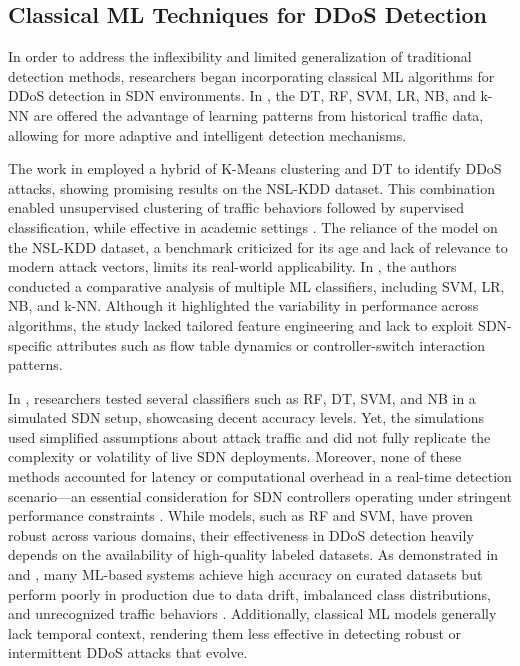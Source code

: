\documentclass[ASNA,twocolumn]{USG} %
\begin{document}
 \subsection{Classical ML Techniques for DDoS Detection}

In order to address the inflexibility and limited generalization of traditional detection methods, researchers began incorporating classical ML algorithms for DDoS detection in SDN environments. In \cite{bansal2022comparative}, the DT, RF, SVM, LR, NB, and k-NN are offered the advantage of learning patterns from historical traffic data, allowing for more adaptive and intelligent detection mechanisms.

The work in \cite{tan2020new} employed a hybrid of K-Means clustering and DT to identify DDoS attacks, showing promising results on the NSL-KDD dataset. This combination enabled unsupervised clustering of traffic behaviors followed by supervised classification, while effective in academic settings \cite{lv2024hybrid}. The reliance of the model on the NSL-KDD dataset, a benchmark criticized for its age and lack of relevance to modern attack vectors, limits its real-world applicability. In \cite{khashab2021ddos}, the authors conducted a comparative analysis of multiple ML classifiers, including SVM, LR, NB, and k-NN. Although it highlighted the variability in performance across algorithms, the study lacked tailored feature engineering and lack to exploit SDN-specific attributes such as flow table dynamics or controller-switch interaction patterns.

In \cite{nadeem2022ddos}, researchers tested several classifiers such as RF, DT, SVM, and NB in a simulated SDN setup, showcasing decent accuracy levels. Yet, the simulations used simplified assumptions about attack traffic and did not fully replicate the complexity or volatility of live SDN deployments. Moreover, none of these methods accounted for latency or computational overhead in a real-time detection scenario—an essential consideration for SDN controllers operating under stringent performance constraints \cite{khashab2021ddos}. While models, such as RF and SVM, have proven robust across various domains, their effectiveness in DDoS detection heavily depends on the availability of high-quality labeled datasets. As demonstrated in \cite{hnamte2024enhancing} and \cite{xu2025deep}, many ML-based systems achieve high accuracy on curated datasets but perform poorly in production due to data drift, imbalanced class distributions, and unrecognized traffic behaviors \cite{palli2023combined}. Additionally, classical ML models generally lack temporal context, rendering them less effective in detecting robust or intermittent DDoS attacks that evolve.
\end{document}

